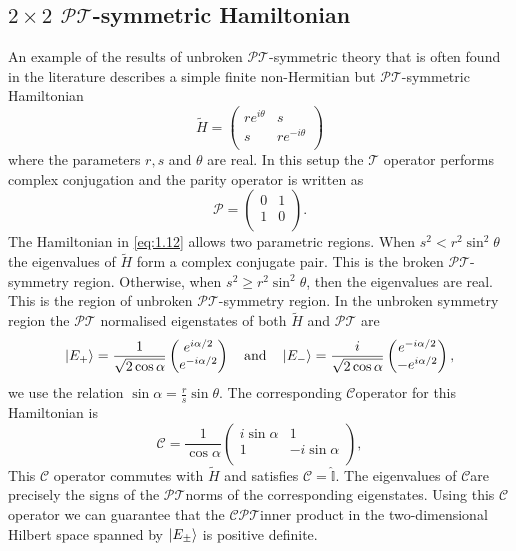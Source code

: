 \documentclass[12pt, a4paper]{report}
\newcommand\PT{\(\mathcal{PT}\)}
\newcommand\TT{\(\mathcal{T}\)}
\newcommand\CC{\(\mathcal{C}\)}
\begin{document}
\subsection{$2\times2$ \PT-symmetric Hamiltonian}
An example of the results of unbroken \PT-symmetric theory that is often found in the literature describes a simple finite non-Hermitian but \PT-symmetric Hamiltonian
\begin{equation}\label{eq:1.12}
\tilde{H} = \begin{pmatrix}
re^{i\theta} & s  \\
s & re^{-i\theta} \\
\end{pmatrix}
\end{equation}
where the parameters $r, s$ and $\theta$ are real. In this setup the \TT\: operator performs complex conjugation and the parity operator is written as
\begin{equation}\label{eq:1.13}
\mathcal{P} = \begin{pmatrix}
0 & 1  \\
1 & 0 \\
\end{pmatrix}.
\end{equation}
The Hamiltonian in \ref{eq:1.12} allows two parametric regions. When $s^2 < r^2\sin^2\theta$ the eigenvalues of $\tilde{H}$ form a complex conjugate pair. This is the broken \PT-symmetry region. Otherwise, when $s^2 \geq r^2\sin^2\theta$, then the eigenvalues are real. This is the region of unbroken \PT-symmetry region. In the unbroken symmetry region the \PT\: normalised eigenstates of both $\tilde{H}$ and \PT\: are
\begin{equation}\label{eq:1.14}
\ket{E_{+}} = \frac{1}{\sqrt{2\cos\alpha}}\begin{pmatrix}
e^{i\alpha/2} \\
e^{-i\alpha/2} \\
\end{pmatrix}\quad\mathrm{and}\quad\ket{E_{-}} = \frac{i}{\sqrt{2\cos\alpha}}\begin{pmatrix}
e^{-i\alpha/2} \\
-e^{i\alpha/2} \\
\end{pmatrix},
\end{equation}
we use the relation $\sin\alpha = \frac{r}{s}\sin\theta$.
The corresponding \CC operator for this Hamiltonian is 
\begin{equation}\label{eq:1.15}
\mathcal{C} = \frac{1}{\cos\alpha}\begin{pmatrix}
i\sin\alpha & 1 \\
1 & -i\sin\alpha\\
\end{pmatrix},
\end{equation}
This \CC\: operator commutes with $\tilde{H}$ and satisfies \CC\:$= \hat{\mathbb{I}}$. The eigenvalues of \CC\:are precisely the signs of the \PT\:norms of the corresponding eigenstates\cite{Bender_2004}. Using this \CC\: operator we can guarantee that the \CC\PT inner product in the two-dimensional Hilbert space spanned by $\ket{E_{\pm}}$ is positive definite.
\end{document}
